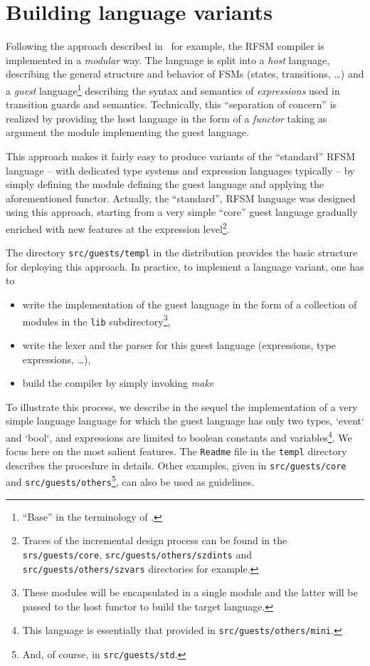 \chapter{ Building language variants}
\label{cha:variants}

Following the approach described in~\cite{Leroy00} for example, the RFSM compiler is implemented in
a \emph{modular} way. The language is split into a \emph{host} language, describing the general
structure and behavior of FSMs (states, transitions, \ldots) and a \emph{guest}
language\footnote{``Base'' in the terminology of \cite{Leroy00}.} describing the syntax and
semantics of \emph{expressions} used in transition guards and semantics. 
Technically, this ``separation of concern'' is realized by providing the host language in the form
of a \emph{functor} taking as argument the module implementing the guest language.

This approach makes it fairly easy to produce variants of the ``standard'' RFSM language -- with
dedicated type systems and expression languages typically -- by simply defining the module defining
the guest language and applying the aforementioned functor. Actually, the ``standard'', RFSM
  language was designed using this approach, starting from a very simple ``core'' guest
  language gradually enriched with new features at the expression level\footnote{Traces of the
    incremental design process can be found in the \texttt{srs/guests/core},
    \texttt{src/guests/others/szdints} and \texttt{src/guests/others/szvars} directories for example.}. 

The directory \verb|src/guests/templ| in the distribution provides the basic structure for deploying
this approach. In practice, to implement a language variant, one has to
\begin{itemize}
\item write the implementation of the guest language in the form of a collection of modules in the
  \texttt{lib} subdirectory\footnote{These modules will be encapsulated in a single module and the
    latter will be passed to the host functor to build the target language.},
\item write the lexer and the parser for this guest language (expressions, type expressions, \ldots),
\item build the compiler by simply invoking \emph{make}  
\end{itemize}

\medskip
To illustrate this process, we describe in the sequel the implementation of a very simple language
language for which the guest language has only two types, `event` and `bool`,
and expressions are limited to boolean constants and variables\footnote{This language is essentially
  that provided in \texttt{src/guests/others/mini}.}. We focus here on the most salient features. 
The \texttt{Readme} file in the  \texttt{templ} directory describes the procedure in
details. Other examples, given in \verb|src/guests/core| and \verb|src/guests/others|\footnote{And, of
  course, in \texttt{src/guests/std}.}, can also be used as guidelines. 

